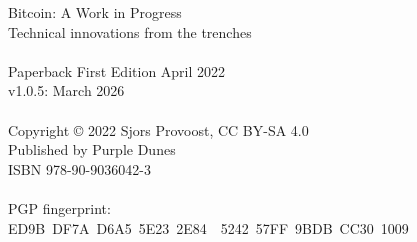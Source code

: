 \newpage
{\setlength{\parindent}{0cm}
\begin{vplace}
Bitcoin: A Work in Progress\\
Technical innovations from the trenches\\
\\
Paperback First Edition April 2022\\
v1.0.5: March 2026\\
\\
Copyright © 2022 Sjors Provoost, CC BY-SA 4.0\\
Published by Purple Dunes\\
ISBN 978-90-9036042-3\\


\\

PGP fingerprint:\\
ED9B DF7A D6A5 5E23 2E84  5242 57FF 9BDB CC30 1009\\

\end{vplace}
}
